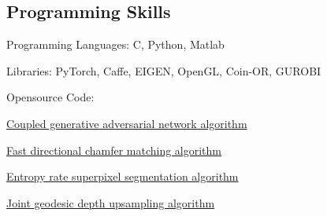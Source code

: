 \documentclass[10pt,letterpaper]{article}
\newenvironment{indentsection}[1]%
{\begin{list}{}%
	{\setlength{\leftmargin}{#1}}%
	\item[]%
}
{\end{list}}
\newcommand{\CPP}
{C\nolinebreak[4]\hspace{-.05em}\raisebox{.22ex}{\footnotesize\bf ++}}
\begin{document}
\subsection*{Programming Skills}
\begin{indentsection}{\parindent}
\begin{description*}
	\item[Programming Languages:]
	\CPP, Python, Matlab
	\item[Libraries:]
    PyTorch, Caffe, EIGEN, OpenGL, Coin-OR, GUROBI
	\item[Opensource Code:] $\quad$
	\begin{itemize*}
    \item \href{https://github.com/mingyuliutw/cogan_pytorch.git}{Coupled generative adversarial network algorithm}		
    \item \href{https://github.com/mingyuliutw/fdcm.git}{Fast directional chamfer matching algorithm}
    \item \href{https://github.com/mingyuliutw/ers.git}{Entropy rate superpixel segmentation algorithm}
    \item \href{http://www.merl.com/research/license/}{Joint geodesic depth upsampling algorithm}
  \end{itemize*}
\end{description*}
\end{indentsection}
\end{document}
